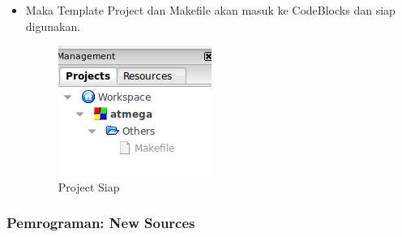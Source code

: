 \documentclass[12pt,]{article}
\begin{document}
\begin{itemize}
		\newpage
		\item Maka Template Project dan Makefile akan masuk ke CodeBlocks dan siap digunakan.

		\begin{figure}[H]
			\centering
			\includegraphics[width=0.5\linewidth]{images/cbp_2}
			\caption{Project Siap}
		\end{figure}

	\end{itemize}

	\newpage
	\subsubsection{Pemrograman: New Sources}
\end{document}
